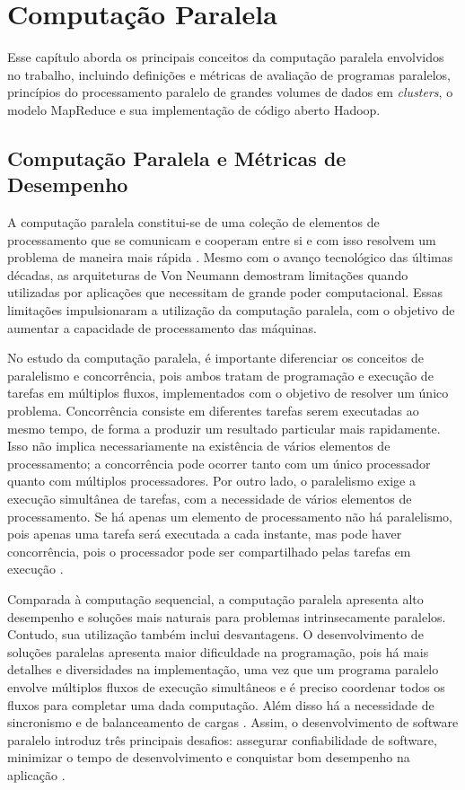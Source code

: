 \chapter{Computação Paralela}
\label{cap:referencial}

Esse capítulo aborda os principais conceitos da computação paralela envolvidos no trabalho, incluindo definições e métricas de avaliação de programas paralelos,
princípios do processamento paralelo de grandes volumes de dados em \textit{clusters}, o modelo MapReduce e sua implementação de código aberto Hadoop.


\section{Computação Paralela e Métricas de Desempenho}
\label{sec:computacaoparalela}

A computação paralela constitui-se de uma coleção de elementos de processamento que se comunicam e cooperam entre si e com isso resolvem um problema de maneira mais rápida \cite{Almasi:1994}. Mesmo com o avanço tecnológico das últimas décadas, as arquiteturas de Von Neumann demostram limitações quando utilizadas por aplicações que necessitam de grande poder computacional. Essas limitações impulsionaram a utilização da computação paralela, com o objetivo de aumentar a capacidade de processamento das máquinas.

No estudo da computação paralela, é importante diferenciar os conceitos de paralelismo e concorrência, pois ambos tratam de programação e execução de tarefas em múltiplos fluxos, implementados com o objetivo de resolver um único problema. Concorrência consiste em diferentes tarefas serem executadas ao mesmo tempo, de forma a produzir um resultado particular mais rapidamente. Isso não implica necessariamente na existência de vários elementos de processamento; a concorrência pode ocorrer tanto com um único processador quanto com múltiplos processadores. 
Por outro lado, o paralelismo exige a execução simultânea de tarefas, com a necessidade de vários elementos de processamento. 
Se há apenas um elemento de processamento não há paralelismo, pois apenas uma tarefa será executada a cada instante, mas pode haver concorrência, pois o processador pode ser compartilhado pelas tarefas em execução \cite{Breshears:2009}.

Comparada à computação sequencial, a computação paralela apresenta alto desempenho e soluções mais naturais para problemas intrinsecamente paralelos. Contudo, sua utilização também inclui desvantagens. O desenvolvimento de soluções paralelas apresenta maior dificuldade na programação, pois há mais detalhes e diversidades na implementação, uma vez que um programa paralelo envolve múltiplos fluxos de execução simultâneos e é preciso coordenar todos os fluxos para completar uma dada computação. Além disso há a necessidade de sincronismo e de balanceamento de cargas \cite{Rauber:2010}. 	Assim, o desenvolvimento de software paralelo introduz três principais desafios: assegurar confiabilidade de software, minimizar o tempo de desenvolvimento e conquistar bom desempenho na aplicação \cite{Leiserson:2008}.

